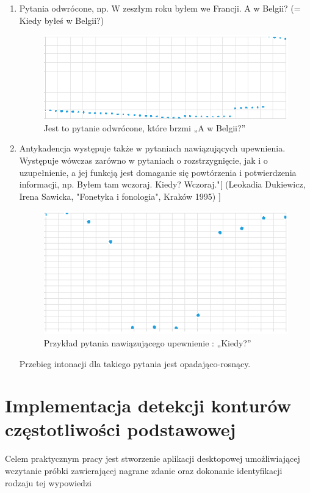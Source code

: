\documentclass[a4paper,12 pt]{article}
\begin{document}
\begin{enumerate}
\begin{enumerate}
\item Pytania odwrócone, np. W zeszłym roku byłem we Francji. A w Belgii? (= Kiedy byłeś w Belgii?) 
\begin{figure}[h]
\centering
\includegraphics[scale=0.9]{pytanie_odwrocone.png}
\caption{Jest to pytanie odwrócone, które brzmi „A w Belgii?”}
\end{figure}
\FloatBarrier
\item Antykadencja występuje  także w pytaniach nawiązujących upewnienia. Występuje wówczas zarówno w  pytaniach o rozstrzygnięcie, jak i o uzupełnienie, a jej funkcją jest domaganie  się powtórzenia i potwierdzenia informacji, np. Byłem tam wczoraj. Kiedy?  Wczoraj."[  (Leokadia Dukiewicz, Irena Sawicka, "Fonetyka i fonologia", Kraków 1995) ]
\begin{figure}[h]

\centering
\includegraphics[scale=0.9]{kiedy.png}
\caption{Przykład pytania nawiązującego upewnienie : „Kiedy?”}
\end{figure}
\FloatBarrier
Przebieg intonacji dla takiego pytania jest opadająco-rosnący.
\end{enumerate}
\end{enumerate}


\section{Implementacja detekcji konturów częstotliwości podstawowej}
Celem praktycznym pracy jest stworzenie aplikacji desktopowej umożliwiającej wczytanie próbki zawierającej nagrane zdanie oraz dokonanie identyfikacji rodzaju tej wypowiedzi
\end{document}
